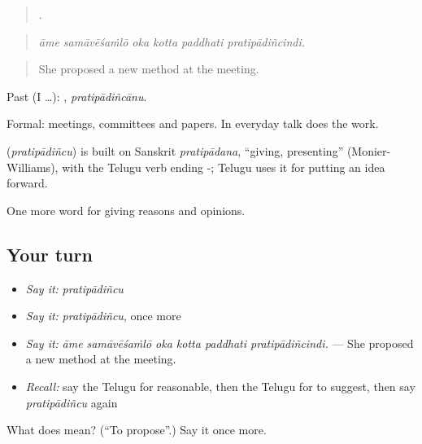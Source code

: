 \begin{quote}
     .
\end{quote}

\begin{quote}
\emph{āme samāvēśaṁlō oka kotta paddhati pratipādiñcindi.}
\end{quote}

\begin{quote}
She proposed a new method at the meeting.
\end{quote}

Past (I …): , \emph{pratipādiñcānu}.

Formal: meetings, committees and papers. In everyday talk  does the work.

\begin{cousinweb}
\textbf{} (\emph{pratipādiñcu}) is built on Sanskrit \emph{pratipādana}, \textquotedblleft{}giving, presenting\textquotedblright{} (Monier-Williams), with the Telugu verb ending -; Telugu uses it for putting an idea forward.
\end{cousinweb}

\begin{grammarlens}[title={What you've built}]
One more word for giving reasons and opinions.
\end{grammarlens}

\subsection*{Your turn}
\begin{itemize}
\raggedright
  \item \emph{Say it:} \emph{pratipādiñcu}
  \item \emph{Say it:} \emph{pratipādiñcu}, once more
  \item \emph{Say it:} \emph{āme samāvēśaṁlō oka kotta paddhati pratipādiñcindi.} — She proposed a new method at the meeting.
  \item \emph{Recall:} say the Telugu for reasonable, then the Telugu for to suggest, then say \emph{pratipādiñcu} again
\end{itemize}

\begin{tcolorbox}[breakable,colback=teal!4,colframe=teal!35!black,title={Before you move on}]
What does  mean? (\textquotedblleft{}To propose\textquotedblright{}.) Say it once more.
\end{tcolorbox}
